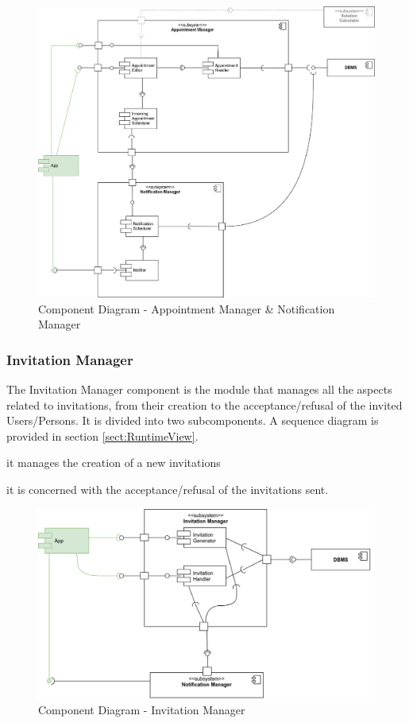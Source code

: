 		\begin{figure}[H]	
			\centerline{\includegraphics[width=0.9\paperwidth]{Images/CD_AppointmentManager}}
			\caption{Component Diagram - Appointment Manager \& Notification Manager}
		\end{figure}
		
	\filbreak
	\subsubsection{Invitation Manager}
		\label{sect:InvitationManager}
		The Invitation Manager component is the module that manages all the aspects related to invitations, from their creation to the acceptance/refusal of the invited Users/Persons. It is divided into two subcomponents. A sequence diagram is provided in section \ref{sect:RuntimeView}.
		\begin{description}[before={\renewcommand{\makelabel}[1]{-- \textit{##1}:}}]
			\item[Invitation Generator] it manages the creation of a new invitations 
			\item[Invitation Handler] it is concerned with the acceptance/refusal of the invitations sent.
		\end{description}
		
		\begin{figure}[H]	
			\centerline{\includegraphics[width=0.9\paperwidth]{Images/CD_InvitationManager}}
			\caption{Component Diagram - Invitation Manager}
		\end{figure}
	
